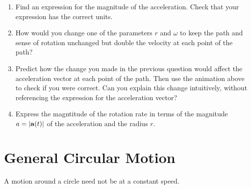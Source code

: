 \documentclass{ximera}
\begin{document}
\begin{question}
\begin{enumerate}
\item Find an expression for the magnitude of the acceleration. Check that your expression has the correct units.

\item How would you change one of the parameters $r$ and $\omega$ to keep the path and sense of rotation unchanged but double the velocity at each point of the path?

\item Predict how the change you made in the previous question would affect the acceleration vector at each point of the path. Then use the animation above to check if you were correct. Can you explain this change intuitively, without referencing the expression for the acceleration vector?

\item Express the magntitude of the rotation rate in terms of the magnitude $a = | {\bf a}(t)|$ of the acceleration and the radius $r$.

\end{enumerate}
\end{question}

\section{General Circular Motion}
A motion around a circle need not be at a constant speed. 
\end{document}
